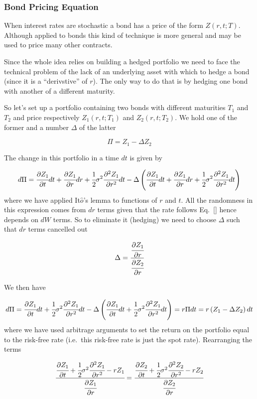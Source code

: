 \subsubsection{Bond Pricing Equation}\label{bond-pricing-equation}

When interest rates are stochastic a bond has a price of the form
\(Z(r, t; T)\). Although applied to bonds this kind of technique is more
general and may be used to price many other contracts.

Since the whole idea relies on building a hedged portfolio we need to
face the technical problem of the lack of an underlying asset with which
to hedge a bond (since it is a ``derivstive'' of \(r\)). The only way to
do that is by hedging one bond with another of a different maturity.

So let's set up a portfolio containing two bonds with different
maturities \(T_1\) and \(T_2\) and price respectively \(Z_1(r, t; T_1)\)
and \(Z_2(r, t; T_2)\). We hold one of the former and a number
\(\Delta\) of the latter

\[\Pi = Z_1 − \Delta Z_2\]

The change in this portfolio in a time \(dt\) is given by

\[d\Pi = \cfrac{\partial Z_1}{\partial t}dt + \cfrac{\partial Z_1}{\partial r}dr + \cfrac{1}{2}\sigma^2 \cfrac{\partial^2 Z_1}{\partial r^2}dt - \Delta\left(\cfrac{\partial Z_1}{\partial t}dt + \cfrac{\partial Z_1}{\partial r}dr + \cfrac{1}{2}\sigma^2 \cfrac{\partial^2 Z_1}{\partial r^2}dt\right)
\]
where we have applied It\(\hat{o}\)'s lemma to functions of \(r\) and
\(t\). All the randomness in this expression comes from \(dr\) terms
given that the rate follows Eq.~\ref{} hence depends on
\(dW\) terms. So to eliminate it (hedging) we need to choose \(\Delta\)
such that \(dr\) terms cancelled out

\[\Delta = \cfrac{\cfrac{\partial Z_1}{\partial r}}{\cfrac{\partial Z_2}{\partial r}}\]

We then have

\[d\Pi = \cfrac{\partial Z_1}{\partial t}dt + \cfrac{1}{2}\sigma^2 \cfrac{\partial^2 Z_1}{\partial r^2}dt - \Delta\left(\cfrac{\partial Z_1}{\partial t}dt + \cfrac{1}{2}\sigma^2 \cfrac{\partial^2 Z_1}{\partial r^2}dt\right) = r \Pi dt = r \left(Z_1 - \Delta Z_2\right)dt
\]
where we have used arbitrage arguments to set the return on the
portfolio equal to the risk-free rate (i.e.~this risk-free rate is just
the spot rate). Rearranging the terms

\[\cfrac{\cfrac{\partial Z_1}{\partial t} + \cfrac{1}{2}\sigma^2 \cfrac{\partial^2 Z_1}{\partial r^2} - rZ_1}{\cfrac{\partial Z_1}{\partial r}}=\cfrac{\cfrac{\partial Z_2}{\partial t} + \cfrac{1}{2}\sigma^2 \cfrac{\partial^2 Z_2}{\partial r^2} - rZ_2}{\cfrac{\partial Z_2}{\partial r}}
\]

